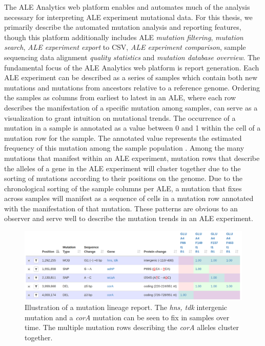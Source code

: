 \documentclass[12pt,final,masters,chapterheads]{ucsd}  %
\begin{document}
The ALE Analytics web platform enables and automates much of the analysis necessary for interpreting ALE experiment mutational data. For this thesis, we primarily describe the automated mutation analysis and reporting features, though this platform additionally includes ALE \textit{mutation filtering},  \textit{mutation search}, \textit{ALE experiment export} to CSV, \textit{ALE experiment comparison}, sample sequencing data alignment \textit{quality statistics} and \textit{mutation database overview}. The fundamental focus of the ALE Analytics web platform is report generation. Each ALE experiment can be described as a series of samples which contain both new mutations and mutations from ancestors relative to a reference genome. Ordering the samples as columns from earliest to latest in an ALE, where each row describes the manifestation of a specific mutation among samples, can serve as a visualization to grant intuition on mutational trends. The occurrence of a mutation in a sample is annotated as a value between 0 and 1 within the cell of a mutation row for the sample. The annotated value represents the estimated frequency of this mutation among the sample population \cite{breseq_paper}. Among the many mutations that manifest within an ALE experiment, mutation rows that describe the alleles of a gene in the ALE experiment will cluster together due to the sorting of mutations according to their positions on the genome. Due to the chronological sorting of the sample columns per ALE, a mutation that fixes across samples will manifest as a sequence of cells in a mutation row annotated with the manifestation of that mutation. These patterns are obvious to an observer and serve well to describe the mutation trends in an ALE experiment.

\begin{figure}[H]
  \centering
  \includegraphics[width=1\textwidth]{mutation_lineage_report.png}
  \caption{Illustration of a mutation lineage report. The \textit{hns, tdk} intergenic mutation and a \textit{corA} mutation can be seen to fix in samples over time. The multiple mutation rows describing the \textit{corA} alleles cluster together.}
  \label{fig:mutation_lineage_report}
\end{figure}
\end{document}
